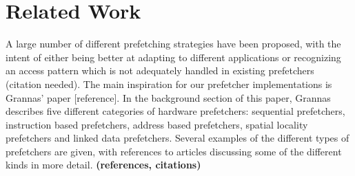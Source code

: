 
\section{Related Work}
\label{sec:relatedWork}

A large number of different prefetching strategies have been proposed,
with the intent of either being better at adapting to different
applications or recognizing an access pattern which is not adequately
handled in existing prefetchers (citation needed). The main
inspiration for our prefetcher implementations is Grannas' paper
[reference]. In the background section of this paper, Grannas
describes five different categories of hardware prefetchers:
sequential prefetchers, instruction based prefetchers, address based
prefetchers, spatial locality prefetchers and linked data
prefetchers. Several examples of the different types of prefetchers
are given, with references to articles discussing some of the
different kinds in more detail. 
 {\bf (references, citations)}
